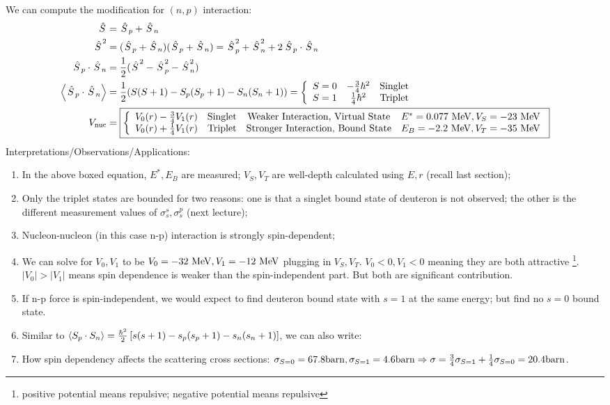 \documentclass{school-22.101-notes}
\begin{document}
We can compute the modification for $(n,p)$ interaction:
\begin{align*}
\left. \hat{S} \right. &= \left. \hat{S} \right._p + \left. \hat{S} \right._n \\
\left. \hat{S} \right.^2 &= (\left. \hat{S} \right._p + \left. \hat{S} \right._n )(\left. \hat{S} \right._p + \left. \hat{S} \right._n) = \left. \hat{S} \right._p^2 + \left. \hat{S} \right._n^2 + 2 \left. \hat{S} \right._p \cdot \left. \hat{S} \right._n \\
\left. \hat{S} \right._p \cdot \left. \hat{S} \right._n &= \frac{1}{2} (\left. \hat{S} \right.^2 - \left. \hat{S} \right._p^2 - \left. \hat{S} \right._n^2) \\
\left< \left. \hat{S} \right._p \cdot \left. \hat{S} \right._n \right>&= \frac{1}{2} (S(S+1) - S_p (S_p+1) - S_n (S_n+1) ) 
= \left\{ \begin{array}{ccc} S=0 & -\frac{3}{4} \hbar^2 & \mbox{Singlet} \\ S=1 & \frac{1}{4} \hbar^2 & \mbox{Triplet} \end{array} \right. \\
V_{\mathrm{nuc}} &= \boxed{ \left\{ \begin{array}{cccc} 
V_0 (r) - \frac{3}{4} V_1(r)  & \mbox{Singlet}& \mbox{Weaker Interaction, Virtual State} & E^* = 0.077 \mbox{ } \mathrm{MeV}, V_S = -23 \mbox{ } \mathrm{MeV} \\ 
V_0 (r) + \frac{1}{4} V_1(r)  & \mbox{Triplet}& \mbox{Stronger Interaction, Bound State} & E_B = -2.2 \mbox{ } \mathrm{MeV}, V_T = -35 \mbox{ } \mathrm{MeV}
\end{array}\right. } \\
\end{align*}
Interpretations/Observations/Applications:
\begin{enumerate}
\item In the above boxed equation, $E^*, E_B$ are measured; $V_S, V_T$ are well-depth calculated using $E, r$ (recall last section);
\item Only the triplet states are bounded for two reasons: one is that a singlet bound state of deuteron is not observed; the other is the different measurement values of $\sigma_s^s, \sigma_s^p$ (next lecture);
\item Nucleon-nucleon (in this case n-p) interaction is strongly spin-dependent;
\item We can solve for $V_0, V_1$ to be $V_0 = -32 \mbox{ } \mathrm{MeV}, V_1 = -12 \mbox{ } \mathrm{MeV}$ plugging in $V_S, V_T$.
$V_0 <0, V_1 <0$ meaning they are both attractive \footnote{positive potential means repulsive; negative potential means repulsive}. $|V_0| > |V_1|$ means spin dependence is weaker than the spin-independent part. But both are significant contribution. 
\item If n-p force is spin-independent, we would expect to find deuteron bound state with $s=1$ at the same energy; but find no $s=0$ bound state. 

\item Similar to $ \left< S_p \cdot S_n \right> = \frac{\hbar^2}{2} \left[ s(s+1) - s_p (s_p + 1) - s_n (s_n + 1) \right] $, we can also write:

\item How spin dependency affects the scattering cross sections: $\sigma_{S=0} = 67.8 \mathrm{barn}, \sigma_{S=1} = 4.6 \mathrm{barn} \Rightarrow \sigma = \frac{3}{4} \sigma_{S=1} + \frac{1}{4} \sigma_{S=0} = 20.4 \mathrm{barn}$. 
\end{enumerate}
\end{document}
